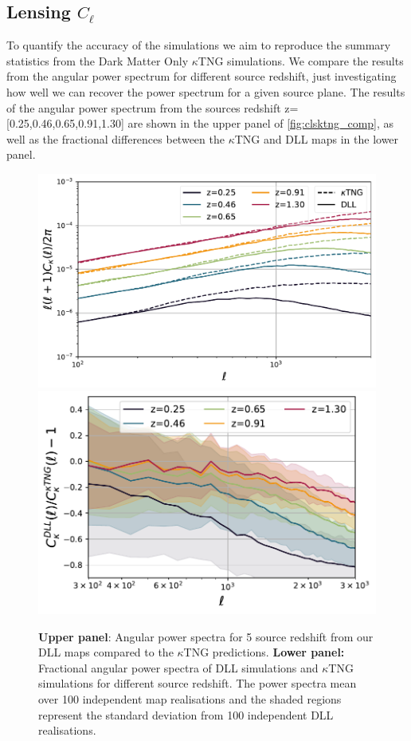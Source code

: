 \documentclass{aa}
\begin{document}
\subsection{Lensing $C_\ell$}
To quantify the accuracy of the simulations we aim to reproduce the summary statistics from the Dark Matter Only $\kappa$TNG simulations. 
We compare the results from the angular power spectrum for different source redshift, just investigating how well we can recover the power spectrum for a given source plane. The results of the angular power spectrum from the sources redshift z=[0.25,0.46,0.65,0.91,1.30] are shown in the upper panel of \autoref{fig:clsktng_comp}, as well as the fractional differences between the $\kappa$TNG and DLL maps in the lower panel.
\begin{figure}
    \centering
    \includegraphics[width=0.95\columnwidth]{paper/figures/cls_DLL_vs_ktng.pdf}
    \includegraphics[width=\columnwidth]{paper/figures/res_cls_DLL_vs_ktng.pdf}
    \caption{
    \textbf{Upper panel}: Angular power spectra for 5 source redshift from
our DLL maps compared to the $\kappa$TNG predictions.
 \textbf{Lower panel:} Fractional angular power spectra of DLL simulations and $\kappa$TNG simulations for different source redshift.
  The power spectra mean over 100 independent map realisations and the shaded regions represent the standard deviation from 100 independent DLL realisations.}
     \label{fig:clsktng_comp}
\end{figure}
\end{document}
